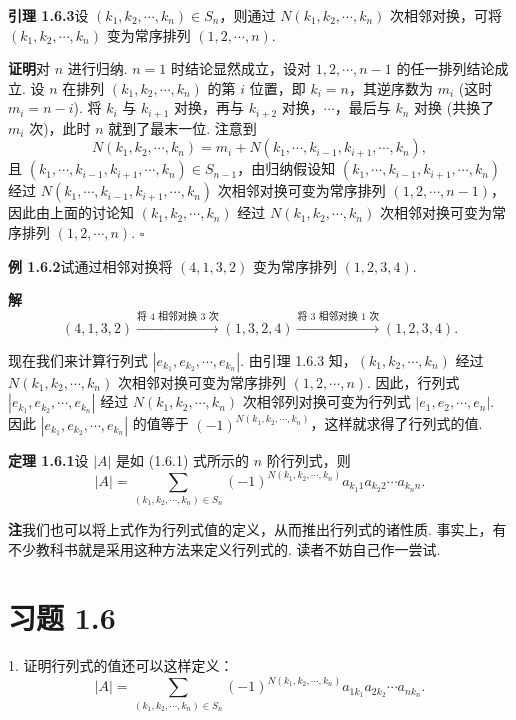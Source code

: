 \documentclass[UTF8, 12pt, fontset=fandol, oneside]{ctexart}
\begin{document}
\noindent\textbf{引理 1.6.3}\quad 设 $(k_1,k_2,\cdots,k_n)\in S_n$，则通过 $N(k_1,k_2,\cdots,k_n)$ 次相邻对换，可将 $(k_1,k_2,\cdots,k_n)$ 变为常序排列 $(1,2,\cdots,n)$.

\noindent\textbf{证明}\quad 对 $n$ 进行归纳. $n=1$ 时结论显然成立，设对 $1,2,\cdots,n-1$ 的任一排列结论成立. 设 $n$ 在排列 $(k_1,k_2,\cdots,k_n)$ 的第 $i$ 位置，即 $k_i=n$，其逆序数为 $m_i$ (这时 $m_i=n-i$). 将 $k_i$ 与 $k_{i+1}$ 对换，再与 $k_{i+2}$ 对换，$\cdots$，最后与 $k_n$ 对换 (共换了 $m_i$ 次)，此时 $n$ 就到了最末一位. 注意到
\[
N(k_1,k_2,\cdots,k_n)=m_i+N(k_1,\cdots,k_{i-1},k_{i+1},\cdots,k_n),
\]
且 $(k_1,\cdots,k_{i-1},k_{i+1},\cdots,k_n)\in S_{n-1}$，由归纳假设知 $(k_1,\cdots,k_{i-1},k_{i+1},\cdots,k_n)$ 经过 $N(k_1,\cdots,k_{i-1},k_{i+1},\cdots,k_n)$ 次相邻对换可变为常序排列 $(1,2,\cdots,n-1)$，因此由上面的讨论知 $(k_1,k_2,\cdots,k_n)$ 经过 $N(k_1,k_2,\cdots,k_n)$ 次相邻对换可变为常序排列 $(1,2,\cdots,n)$. \(\square\)

\noindent\textbf{例 1.6.2}\quad 试通过相邻对换将 $(4,1,3,2)$ 变为常序排列 $(1,2,3,4)$.

\noindent\textbf{解}\quad
\[
(4,1,3,2)\xrightarrow{\text{将 4 相邻对换 3 次}}(1,3,2,4)
\xrightarrow{\text{将 3 相邻对换 1 次}}(1,2,3,4).
\]

现在我们来计算行列式 $|e_{k_1},e_{k_2},\cdots,e_{k_n}|$. 由引理 1.6.3 知，$(k_1,k_2,\cdots,k_n)$ 经过 $N(k_1,k_2,\cdots,k_n)$ 次相邻对换可变为常序排列 $(1,2,\cdots,n)$. 因此，行列式 $|e_{k_1},e_{k_2},\cdots,e_{k_n}|$ 经过 $N(k_1,k_2,\cdots,k_n)$ 次相邻列对换可变为行列式 $|e_1,e_2,\cdots,e_n|$. 因此 $|e_{k_1},e_{k_2},\cdots,e_{k_n}|$ 的值等于 $(-1)^{N(k_1,k_2,\cdots,k_n)}$，这样就求得了行列式的值.

\noindent\textbf{定理 1.6.1}\quad 设 $|A|$ 是如 (1.6.1) 式所示的 $n$ 阶行列式，则
\begin{equation}
|A|=\sum_{(k_1,k_2,\cdots,k_n)\in S_n}
(-1)^{N(k_1,k_2,\cdots,k_n)}
a_{k_1 1}a_{k_2 2}\cdots a_{k_n n}.
\tag{1.6.2}
\end{equation}

\noindent\textbf{注}\quad 我们也可以将上式作为行列式值的定义，从而推出行列式的诸性质. 事实上，有不少教科书就是采用这种方法来定义行列式的. 读者不妨自己作一尝试.

\section*{习题 1.6}

1. 证明行列式的值还可以这样定义：
\begin{equation}
|A|=\sum_{(k_1,k_2,\cdots,k_n)\in S_n}
(-1)^{N(k_1,k_2,\cdots,k_n)}
a_{1k_1}a_{2k_2}\cdots a_{nk_n}.
\tag{1.6.3}
\end{equation}
\end{document}
